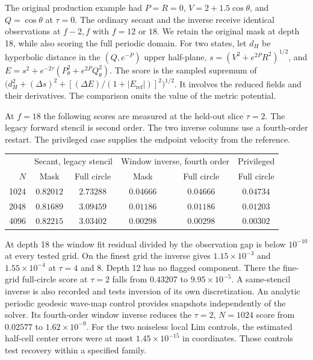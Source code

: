 The original production example had $P=R=0$,
$V=2+1.5\cos\theta$, and $Q=\cos\theta$ at $\tau=0$.
The ordinary secant and the inverse receive identical observations
at $f-2,f$ with $f=12$ or $18$. We retain the original mask at
depth 18, while also scoring the full periodic domain.
For two states, let $d_H$ be hyperbolic distance in the $(Q,e^{-P})$
upper half-plane, $s=(V^2+e^{2P}R^2)^{1/2}$, and
$E=s^2+e^{-2\tau}(P_\theta^2+e^{2P}Q_\theta^2)$.
The score is the sampled supremum of
$\bigl(d_H^2+(\Delta s)^2+[(\Delta E)/(1+|E_{\mathrm{ref}}|)]^2\bigr)^{1/2}$.
It involves the reduced fields and their derivatives.
The comparison omits the value of the metric potential.

At $f=18$ the following scores are measured at the held-out
slice $\tau=2$. The legacy forward stencil is second order.
The two inverse columns use a fourth-order restart. The
privileged case supplies the endpoint velocity from the reference.
\begin{center}
\begin{tabular}{rccccc}
\toprule
 & \multicolumn{2}{c}{Secant, legacy stencil} &
 \multicolumn{2}{c}{Window inverse, fourth order} & Privileged \\
$N$ & Mask & Full circle & Mask & Full circle & Full circle\\
\midrule
1024 & $0.82012$ & $2.73288$ & $0.04666$ & $0.04666$ & $0.04734$\\
2048 & $0.81689$ & $3.09459$ & $0.01186$ & $0.01186$ & $0.01203$\\
4096 & $0.82215$ & $3.03402$ & $0.00298$ & $0.00298$ & $0.00302$\\
\bottomrule
\end{tabular}
\end{center}
At depth 18 the window fit residual divided by the observation
gap is below $10^{-10}$ at every tested grid. On the finest
grid the inverse gives $1.15\times10^{-3}$ and $1.55\times10^{-4}$
at $\tau=4$ and $8$. Depth 12 has no flagged component.
There the fine-grid full-circle score at $\tau=2$ falls from
$0.43207$ to $9.95\times10^{-5}$.
A same-stencil inverse is also recorded and tests inversion of its
own discretization. An analytic periodic geodesic wave-map control
provides snapshots independently of the solver. Its fourth-order
window inverse reduces the $\tau=2$, $N=1024$ score from
$0.02577$ to $1.62\times10^{-9}$.
For the two noiseless local Lim controls, the estimated half-cell
center errors were at most $1.45\times10^{-15}$ in coordinates.
Those controls test recovery within a specified family.


